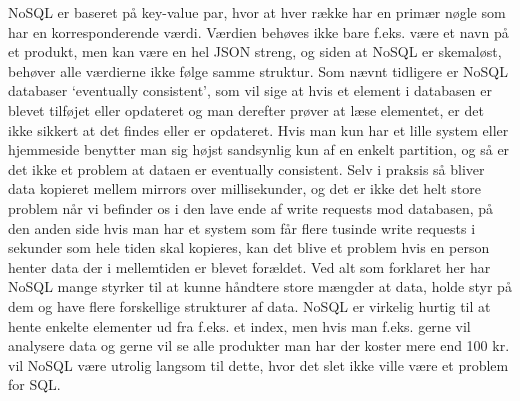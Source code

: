 NoSQL er baseret på key-value par, hvor at hver række har en primær nøgle som har en korresponderende værdi. Værdien behøves ikke bare f.eks. være et navn på et produkt, men kan være en hel JSON streng, og siden at NoSQL er skemaløst, behøver alle værdierne ikke følge samme struktur. Som nævnt tidligere er NoSQL databaser ‘eventually consistent’, som vil sige at hvis et element i databasen er blevet tilføjet eller opdateret og man derefter prøver at læse elementet, er det ikke sikkert at det findes eller er opdateret. Hvis man kun har et lille system eller hjemmeside benytter man sig højst sandsynlig kun af en enkelt partition, og så er det ikke et problem at dataen er eventually consistent. Selv i praksis så bliver data kopieret mellem mirrors over millisekunder, og det er ikke det helt store problem når vi befinder os i den lave ende af write requests mod databasen, på den anden side hvis man har et system som får flere tusinde write requests i sekunder som hele tiden skal kopieres, kan det blive et problem hvis en person henter data der i mellemtiden er blevet forældet. Ved alt som forklaret her har NoSQL mange styrker til at kunne håndtere store mængder at data, holde styr på dem og have flere forskellige strukturer af data. NoSQL er virkelig hurtig til at hente enkelte elementer ud fra f.eks. et index, men hvis man f.eks. gerne vil analysere data og gerne vil se alle produkter man har der koster mere end 100 kr. vil NoSQL være utrolig langsom til dette, hvor det slet ikke ville være et problem for SQL. 
